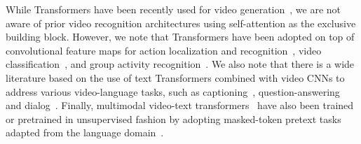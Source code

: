 \documentclass{article}
\begin{document}
While Transformers have been recently used for video generation~\cite{Weissenborn:ICLR2020}, we are not aware of prior video recognition architectures using self-attention as the exclusive building block. However, we note that Transformers have been adopted on top of convolutional feature maps for action localization and recognition~\cite{ActionTransformer}, video classification~\cite{NLN, doubleattention},  and group activity recognition~\cite{Gavrilyuk:CVPR2020}. We also note that there is a wide literature based on the use of text Transformers combined with video CNNs to address various video-language tasks, such as captioning~\cite{zhou2018end}, question-answering~\cite{yang2020bert} and dialog~\cite{le2019multimodal}. Finally, multimodal video-text transformers~\cite{VideoBERT, li2020hero} have also been trained or pretrained in unsupervised fashion by adopting masked-token pretext tasks adapted from the language domain~\cite{BERT,radford2018improving}. %



\end{document}
